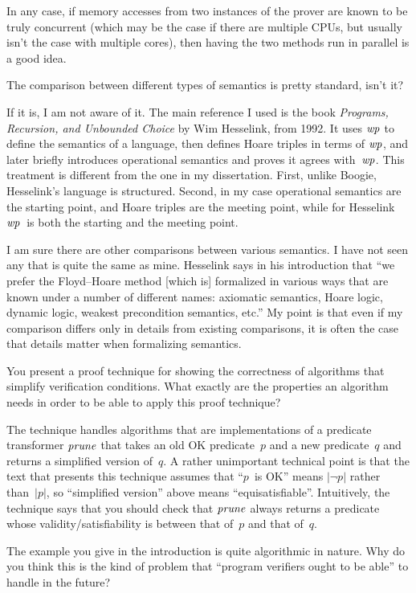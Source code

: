 In any case, if memory accesses from two instances of the prover are
known to be truly concurrent (which may be the case if there are multiple
CPUs, but usually isn't the case with multiple cores), then having the two
methods run in parallel is a good idea.

\Q The comparison between different types of semantics is pretty standard,
isn't it?

\A If it is, I am not aware of it. The main reference I used is the book
{\sl Programs, Recursion, and Unbounded Choice\/} by Wim Hesselink, from
1992. It uses ${\it wp}$ to define the semantics of a language, then
defines Hoare triples in terms of ${\it wp}$, and later briefly introduces
operational semantics and proves it agrees with~${\it wp}$.  This treatment
is different from the one in my dissertation. First, unlike Boogie,
Hesselink's language is structured. Second, in my case operational
semantics are the starting point, and Hoare triples are the meeting point,
while for Hesselink ${\it wp}$~is both the starting and the meeting point.

I am sure there are other comparisons between various semantics. I have not
seen any that is quite the same as mine. Hesselink says in his introduction
that ``we prefer the Floyd--Hoare method [which is] formalized in various
ways that are known under a number of different names: axiomatic semantics,
Hoare logic, dynamic logic, weakest precondition semantics, etc.'' My point
is that even if my comparison differs only in details from existing
comparisons, it is often the case that details matter when formalizing
semantics.


\Q You present a proof technique for showing the correctness of algorithms
that simplify verification conditions. What exactly are the properties an
algorithm needs in order to be able to apply this proof technique?

\A The technique handles algorithms that are implementations of a predicate
transformer ${\it prune}$ that takes an old OK predicate~$p$ and a new
predicate~$q$ and returns a simplified version of~$q$. A rather unimportant
technical point is that the text that presents this technique assumes that
``$p$~is OK'' means $|\lnot p|$ rather than~$|p|$, so ``simplified
version'' above means ``equisatisfiable''. Intuitively, the technique says
that you should check that ${\it prune}$ always returns a predicate whose
validity/satisfiability is between that of~$p$ and that of~$q$.

\Q The example you give in the introduction is quite algorithmic in nature.
Why do you think this is the kind of problem that ``program verifiers
ought to be able'' to handle in the future?

